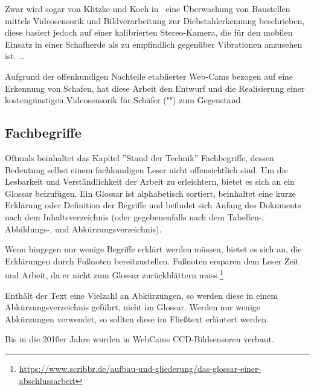 Zwar wird sogar von Klitzke und Koch in~\cite{klitzke2016} eine Überwachung von Baustellen mittels Videosensorik und Bildverarbeitung zur Diebstahlerkennung beschrieben, diese basiert jedoch auf einer kalibrierten Stereo-Kamera, die für den mobilen Einsatz in einer Schafherde als zu empfindlich gegenüber Vibrationen anzusehen ist.
\dots

Aufgrund der offenkundigen Nachteile etablierter Web-Cams bezogen auf eine Erkennung von Schafen, hat diese Arbeit den Entwurf und die Realisierung einer kostengünstigen Videosensorik für Schäfer ("") zum Gegenstand.

\subsection{Fachbegriffe}
\label{sec:Fachbegriffe}
Oftmals beinhaltet das Kapitel ''Stand der Technik'' Fachbegriffe, dessen Bedeutung selbst einem fachkundigen Leser nicht offensichtlich sind. Um die Lesbarkeit und Verständlichkeit der Arbeit zu erleichtern, bietet es sich an ein Glossar beizufügen. Ein Glossar ist alphabetisch sortiert, beinhaltet eine kurze Erklärung oder Definition der Begriffe und befindet sich Anfang des Dokuments nach dem Inhaltsverzeichnis (oder gegebenenfalls nach dem Tabellen-, Abbildungs-, und Abkürzungsverzeichnis).

Wenn hingegen nur wenige Begriffe erklärt werden müssen, bietet es sich an, die Erklärungen durch Fußnoten bereitzustellen. Fußnoten ersparen dem Leser Zeit und Arbeit, da er nicht zum Glossar zurückblättern muss.\footnote{\url{https://www.scribbr.de/aufbau-und-gliederung/das-glossar-einer-abschlussarbeit}}

Enthält der Text eine Vielzahl an Abkürzungen, so werden diese in einem Abkürzungsverzeichnis geführt, nicht im Glossar. Werden nur wenige Abkürzungen verwendet, so sollten diese im Fließtext erläutert werden.

\example Bis in die 2010er Jahre wurden in \gls{WebCam}s CCD-Bildsensoren verbaut. 
